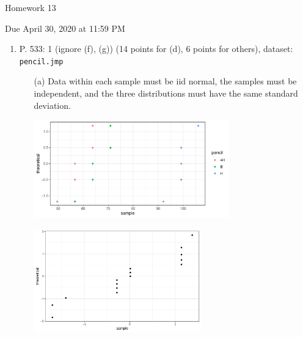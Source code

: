 \documentclass{article}\usepackage[]{graphicx}\usepackage[]{color}
\newenvironment{knitrout}{}{} %
\begin{document}
\begin{center} \LARGE
Homework 13
\end{center}
\begin{center} \Large
Due April 30, 2020 at 11:59 PM 
\end{center}



\begin{enumerate}
	\item P. 533: 1 (ignore (f), (g)) (14 points for (d), 6 points for others), dataset: {\tt pencil.jmp} 
	\begin{itemize}
	\item[(a)]
	Data within each sample must be iid normal, the samples must be independent, and the three distributions must have the same standard deviation.
\begin{knitrout}
\color{fgcolor}

{\centering \includegraphics[width=0.7\textwidth]{figure/unnamed-chunk-2-1} 

}



\end{knitrout}
\begin{knitrout}
\color{fgcolor}

{\centering \includegraphics[width=0.6\textwidth]{figure/unnamed-chunk-3-1} 

}



\end{knitrout}
  

\end{itemize}
\end{enumerate}
\end{document}
